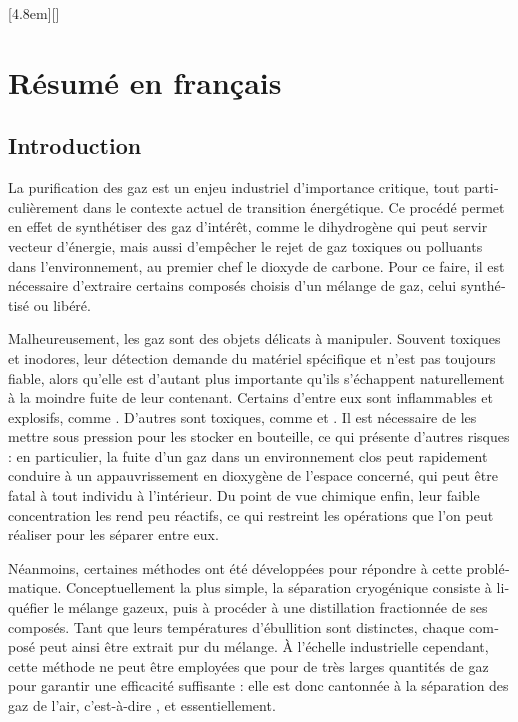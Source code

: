 \documentclass[thesis]{subfiles}
\begin{document}
\begin{otherlanguage}{french}

\renewcommand{\thesection}{\arabic{section}}
\renewcommand{\thesubsection}{\arabic{section}.\arabic{subsection}}
\renewcommand{\thefigure}{R\arabic{figure}}
\setcounter{figure}{0}
[4.8em]{\addvspace{0.1em}}{\contentslabel{2.2em}}{}{\contentspage}[]

\chapter*{Résumé en français}
\startcontents[chapters]
\printpartialtoc
\setcounter{tocdepth}{0}
\setcounter{section}{0}
\clearpage

\section*{Introduction}

La purification des gaz est un enjeu industriel d'importance critique, tout particulièrement dans le contexte actuel de transition énergétique. Ce procédé permet en effet de synthétiser des gaz d'intérêt, comme le dihydrogène qui peut servir vecteur d'énergie, mais aussi d'empêcher le rejet de gaz toxiques ou polluants dans l'environnement, au premier chef le dioxyde de carbone. Pour ce faire, il est nécessaire d'extraire certains composés choisis d'un mélange de gaz, celui synthétisé ou libéré.

Malheureusement, les gaz sont des objets délicats à manipuler. Souvent toxiques et inodores, leur détection demande du matériel spécifique et n'est pas toujours fiable, alors qu'elle est d'autant plus importante qu'ils s'échappent naturellement à la moindre fuite de leur contenant. Certains d'entre eux sont inflammables et explosifs, comme . D'autres sont toxiques, comme  et . Il est nécessaire de les mettre sous pression pour les stocker en bouteille, ce qui présente d'autres risques : en particulier, la fuite d'un gaz dans un environnement clos peut rapidement conduire à un appauvrissement en dioxygène de l'espace concerné, qui peut être fatal à tout individu à l'intérieur. Du point de vue chimique enfin, leur faible concentration les rend peu réactifs, ce qui restreint les opérations que l'on peut réaliser pour les séparer entre eux.

Néanmoins, certaines méthodes ont été développées pour répondre à cette problématique. Conceptuellement la plus simple, la séparation cryogénique consiste à liquéfier le mélange gazeux, puis à procéder à une distillation fractionnée de ses composés. Tant que leurs températures d'ébullition sont distinctes, chaque composé peut ainsi être extrait pur du mélange. À l'échelle industrielle cependant, cette méthode ne peut être employées que pour de très larges quantités de gaz pour garantir une efficacité suffisante : elle est donc cantonnée à la séparation des gaz de l'air, c'est-à-dire ,  et  essentiellement.


\end{otherlanguage}
\end{document}
